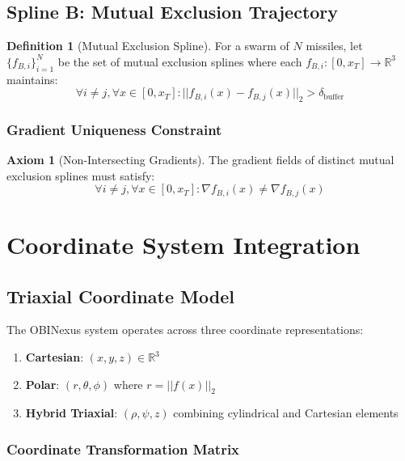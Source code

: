 \documentclass[11pt,a4paper]{article}
\theoremstyle{definition}
\newtheorem{definition}{Definition}[section]
\newtheorem{axiom}{Axiom}[section]
\theoremstyle{plain}
\newcommand{\dbuffer}{\delta_{\text{buffer}}}
\newcommand{\grad}{\nabla}
\begin{document}
\subsection{Spline B: Mutual Exclusion Trajectory}

\begin{definition}[Mutual Exclusion Spline]
For a swarm of $N$ missiles, let $\{f_{B,i}\}_{i=1}^N$ be the set of mutual exclusion splines where each $f_{B,i}: [0, x_T] \rightarrow \mathbb{R}^3$ maintains:
\begin{equation}
\forall i \neq j, \forall x \in [0, x_T]: ||f_{B,i}(x) - f_{B,j}(x)||_2 > \dbuffer
\end{equation}
\end{definition}

\subsubsection{Gradient Uniqueness Constraint}

\begin{axiom}[Non-Intersecting Gradients]
The gradient fields of distinct mutual exclusion splines must satisfy:
\begin{equation}
\forall i \neq j, \forall x \in [0, x_T]: \grad f_{B,i}(x) \neq \grad f_{B,j}(x)
\end{equation}
\end{axiom}

\section{Coordinate System Integration}

\subsection{Triaxial Coordinate Model}

The OBINexus system operates across three coordinate representations:

\begin{enumerate}
    \item \textbf{Cartesian}: $(x, y, z) \in \mathbb{R}^3$
    \item \textbf{Polar}: $(r, \theta, \phi)$ where $r = ||f(x)||_2$
    \item \textbf{Hybrid Triaxial}: $(\rho, \psi, z)$ combining cylindrical and Cartesian elements
\end{enumerate}

\subsubsection{Coordinate Transformation Matrix}
\end{document}
